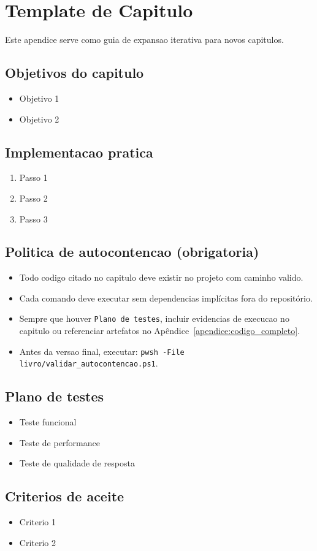 \chapter{Template de Capitulo}
\label{chap:template_capitulo}

Este apendice serve como guia de expansao iterativa para novos capitulos.

\section{Objetivos do capitulo}
\begin{itemize}[leftmargin=*]
  \item Objetivo 1
  \item Objetivo 2
\end{itemize}

\section{Implementacao pratica}
\begin{enumerate}[leftmargin=*]
  \item Passo 1
  \item Passo 2
  \item Passo 3
\end{enumerate}

\section{Politica de autocontencao (obrigatoria)}
\begin{itemize}[leftmargin=*]
  \item Todo codigo citado no capitulo deve existir no projeto com caminho valido.
  \item Cada comando deve executar sem dependencias impl\'icitas fora do reposit\'orio.
  \item Sempre que houver \texttt{Plano de testes}, incluir evidencias de execucao no capitulo
        ou referenciar artefatos no Ap\^endice~\ref{apendice:codigo_completo}.
  \item Antes da versao final, executar: \texttt{pwsh -File livro/validar\_autocontencao.ps1}.
\end{itemize}

\section{Plano de testes}
\begin{itemize}[leftmargin=*]
  \item Teste funcional
  \item Teste de performance
  \item Teste de qualidade de resposta
\end{itemize}

\section{Criterios de aceite}
\begin{itemize}[leftmargin=*]
  \item Criterio 1
  \item Criterio 2
\end{itemize}
